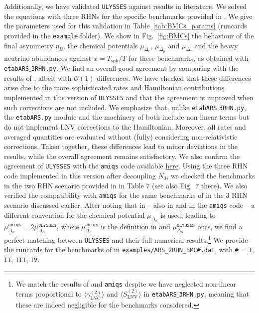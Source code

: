 \documentclass[12pt, a4paper]{article}
\def\sph{\text{sph}}
\def\LNC{\text{LNC}}
\def\LNV{\text{LNV}}
\begin{document}
Additionally, we have validated \texttt{ULYSSES} against results in literature. We solved the equations with three RHNs for the specific benchmarks provided in \cite{Abada:2018oly}. We give the parameters used for this validation in Table~\ref{tab:BMCs_params} (runcards provided in the \texttt{example} folder). We show in Fig.~\ref{fig:BMCs} the behaviour of the final asymmetry $\eta_B$, the chemical potentials $\mu_{\Delta_e}$, $\mu_{\Delta_\mu}$ and $\mu_{\Delta_\tau}$ and the heavy neutrino abundances against $x=T_{\sph}/T$ for these benchmarks, as obtained with \texttt{etabARS$\_$3RHN.py}. We find an overall good agreement by comparing with the results of \cite{Abada:2018oly}, albeit with $\mathcal{O}(1)$ differences. We have checked that these differences arise due to the more sophisticated rates and Hamiltonian contributions implemented in this version of \texttt{ULYSSES} and that the agreement is improved when such corrections are not included. We emphasize that, unlike \texttt{etabARS$\_$3RHN.py}, the \texttt{etabARS.py} module and the machinery of \cite{Abada:2018oly} both include non-linear terms but do not implement LNV corrections to the Hamiltonian. Moreover, all rates and averaged quantities are evaluated without (fully) considering non-relativistic corrections. Taken together, these differences lead to minor deviations in the results, while the overall agreement remains satisfactory. We also confirm the agreement of \texttt{ULYSSES} with the \texttt{amiqs} code available \href{https://github.com/stefanmarinus/amiqs}{here}. Using the three RHN code implemented in this version after decoupling $N_3$, we checked the benchmarks in the two RHN scenario provided in \cite{Hernandez:2022ivz} in Table 7 (see also Fig.~7 there). We also verified the compatibility with \texttt{amiqs} for the same benchmarks of \cite{Abada:2018oly} in the 3 RHN scenario discussed earlier. After noting that in \cite{Hernandez:2022ivz} -- also in \cite{Sandner:2023tcg} and in the \texttt{amiqs} code -- a different convention for the chemical potential $\mu_{\Delta_\alpha}$ is used, leading to $\mu_{\Delta_\alpha}^\texttt{amiqs}= 2\mu_{\Delta_\alpha}^\texttt{ULYSSES}$, where $\mu_{\Delta_\alpha}^\texttt{amiqs}$ is the definition in \cite{Hernandez:2022ivz, Sandner:2023tcg} and $\mu_{\Delta_\alpha}^\texttt{ULYSSES}$ ours, we find a perfect matching between \texttt{ULYSSES} and their full numerical results.\footnote{We match the results of \cite{Hernandez:2022ivz} and \texttt{amiqs} despite we have neglected non-linear terms proportional to $\langle\gamma_{\LNC}^{(2)}\rangle$ and $\langle S_{\LNV}^{(2)}\rangle$ in \texttt{etabARS$\_$3RHN.py}, meaning that these are indeed negligible for the benchmarks considered.} We provide the runcards for the benchmarks of \cite{Hernandez:2022ivz} in \texttt{examples/ARS\_2RHN\_BMC\#.dat}, with \texttt{\#} = \texttt{I}, \texttt{II}, \texttt{III}, \texttt{IV}.
\end{document}
